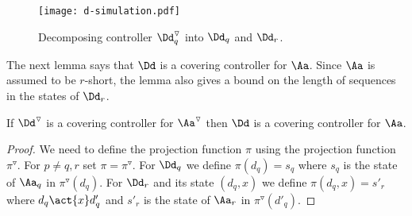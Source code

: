 \documentclass[10pt,a4paper]{article}
\newcommand{\red}[1]{#1^\triangledown}
\begin{document}
\begin{figure}[tbp]
\texttt{[image: d-simulation.pdf]}
  \caption{Decomposing controller $\red\Dd_q$ into $\Dd_q$ and
    $\Dd_r$.}\label{fig:d-simulation}
\end{figure}

The next lemma says that $\Dd$ is a covering controller for
$\Aa$. Since $\Aa$ is assumed to be $r$-short, the lemma also gives a
bound on the length of sequences in the states of $\Dd_r$. 
\begin{lemma}\label{lem:Dcovering}
  If $\red\Dd$ is a covering controller for $\red \Aa$ then $\Dd$ is a
  covering controller for $\Aa$.
\end{lemma}

\begin{proof}
  We need to define the projection function $\pi$ using the projection
  function $\red\pi$. For $p\not=q,r$ set $\pi=\red\pi$. For $\Dd_q$
  we define $\pi(d_q)=s_q$ where $s_q$ is the state of $\Aa_q$ in
  $\red\pi(d_q)$.  For $\Dd_r$ and its state $(d_q,x)$ we define
  $\pi(d_q,x)=s'_r$ where $d_q\act{x}d'_q$ and $s'_r $ is the state of $\Aa_r$ in
  $\red\pi(d'_q)$.


\end{proof}
\end{document}
